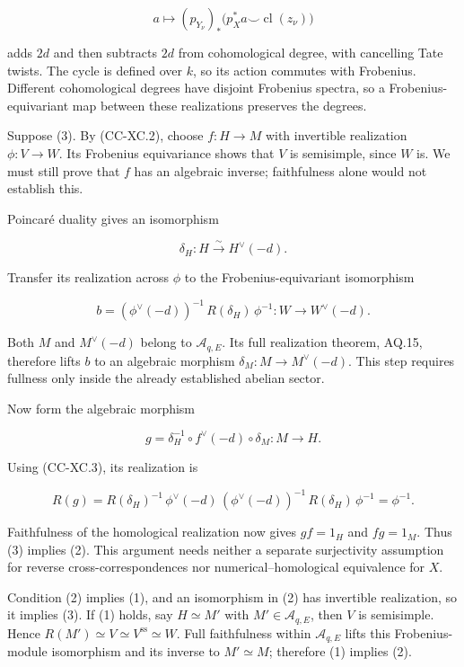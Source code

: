 \documentclass[11pt,a4paper]{article}
\theoremstyle{definition}\newtheorem{definition}[theorem]{Definition}
\theoremstyle{remark}\newtheorem{remark}[theorem]{Remark}
\begin{document}
\[
 a\longmapsto(p_{Y_\nu})_*\bigl(p_X^*a\smile\operatorname{cl}(z_\nu)\bigr)
\]

adds \(2d\) and then subtracts \(2d\) from cohomological degree, with
cancelling Tate twists. The cycle is defined over \(k\), so its action
commutes with Frobenius. Different cohomological degrees have disjoint
Frobenius spectra, so a Frobenius-equivariant map between these
realizations preserves the degrees.

Suppose (3). By (CC-XC.2), choose \(f:H\to M\) with invertible
realization \(\phi:V\to W\). Its Frobenius equivariance shows that \(V\)
is semisimple, since \(W\) is. We must still prove that \(f\) has an
algebraic inverse; faithfulness alone would not establish this.

Poincaré duality gives an isomorphism

\[
 \delta_H:H\xrightarrow{\sim}H^\vee(-d).
\]

Transfer its realization across \(\phi\) to the Frobenius-equivariant
isomorphism

\[
 b=(\phi^\vee(-d))^{-1}\,R(\delta_H)\,\phi^{-1}:
       W\longrightarrow W^\vee(-d).               \tag{CC-XC.3}
\]

Both \(M\) and \(M^\vee(-d)\) belong to \(\mathcal A_{q,E}\). Its full
realization theorem, AQ.15, therefore lifts \(b\) to an algebraic
morphism \(\delta_M:M\to M^\vee(-d)\). This step requires fullness only
inside the already established abelian sector.

Now form the algebraic morphism

\[
 g=\delta_H^{-1}\circ f^\vee(-d)\circ\delta_M:
          M\longrightarrow H.                    \tag{CC-XC.4}
\]

Using (CC-XC.3), its realization is

\[
 R(g)=R(\delta_H)^{-1}\,
       \phi^\vee(-d)\,
       (\phi^\vee(-d))^{-1}\,
       R(\delta_H)\,\phi^{-1}
       =\phi^{-1}.
\]

Faithfulness of the homological realization now gives \(gf=1_H\) and
\(fg=1_M\). Thus (3) implies (2). This argument needs neither a separate
surjectivity assumption for reverse cross-correspondences nor
numerical--homological equivalence for \(X\).

Condition (2) implies (1), and an isomorphism in (2) has invertible
realization, so it implies (3). If (1) holds, say \(H\simeq M'\) with
\(M'\in\mathcal A_{q,E}\), then \(V\) is semisimple. Hence
\(R(M')\simeq V\simeq V^{\mathrm{ss}}\simeq W\). Full faithfulness
within \(\mathcal A_{q,E}\) lifts this Frobenius-module isomorphism and
its inverse to \(M'\simeq M\); therefore (1) implies (2).
\end{document}
